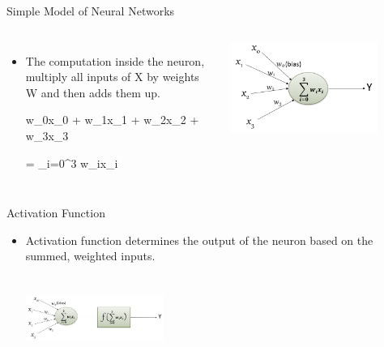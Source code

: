 \documentclass[aspectratio=169,14pt,usenames,dvipsnames]{beamer}
\begin{document}
\begin{frame}{Simple Model of Neural Networks}
\begin{columns}

\begin{itemize}  
  \item The computation inside the neuron, multiply all inputs of X by weights W and then adds them up.\\
    	
      	\begin{itemize} w_{0}x_{0} + w_{1}x_{1} + w_{2}x_{2} + w_{3}x_{3} \end{itemize}
      	\begin{itemize}= \sum_{i=0}^{3} w_{i}x_{i} \end{itemize}
     
\end{itemize}
\includegraphics[width=0.8\textwidth, height=0.6\textheight]{Images/AIML_Percep_IMG3.png}
\end{columns}
\end{frame}

\begin{frame}{Activation Function}
\begin{itemize}
\item Activation function determines the output of the neuron based on the summed, weighted inputs. \\
\centering
\includegraphics[width=4.5cm , height=3.5cm]{Images/AIML_Percep_IMG4.png}
\end{itemize}
\end{frame}
\end{document}
